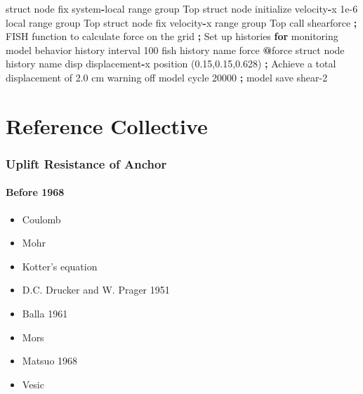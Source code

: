 \documentclass[a4paper, nobind]{templates/ociamthesis}
\providecommand{\tightlist}{%
  \setlength{\itemsep}{0pt}\setlength{\parskip}{0pt}}
\newenvironment{Shaded}{\begin{snugshade}}{\end{snugshade}}
\newcommand{\BuiltInTok}[1]{#1}
\newcommand{\ControlFlowTok}[1]{\textcolor[rgb]{0.13,0.29,0.53}{\textbf{#1}}}
\newcommand{\DecValTok}[1]{\textcolor[rgb]{0.00,0.00,0.81}{#1}}
\newcommand{\FloatTok}[1]{\textcolor[rgb]{0.00,0.00,0.81}{#1}}
\newcommand{\NormalTok}[1]{#1}
\newcommand{\OperatorTok}[1]{\textcolor[rgb]{0.81,0.36,0.00}{\textbf{#1}}}
\newcommand{\StringTok}[1]{\textcolor[rgb]{0.31,0.60,0.02}{#1}}
\renewenvironment{Shaded}
{
  \vspace{10pt}%
  \begin{snugshade}%
}{%
  \end{snugshade}%
  \vspace{8pt}%
}
\begin{document}
\begin{Shaded}
\begin{Highlighting}[]
\NormalTok{    struct node fix system}\OperatorTok{{-}}\NormalTok{local }\BuiltInTok{range}\NormalTok{ group }\StringTok{\textquotesingle{}Top\textquotesingle{}}
\NormalTok{    struct node initialize velocity}\OperatorTok{{-}}\NormalTok{x }\FloatTok{1e{-}6}\NormalTok{ local }\BuiltInTok{range}\NormalTok{ group }\StringTok{\textquotesingle{}Top\textquotesingle{}}
\NormalTok{    struct node fix velocity}\OperatorTok{{-}}\NormalTok{x }\BuiltInTok{range}\NormalTok{ group }\StringTok{\textquotesingle{}Top\textquotesingle{}}
\NormalTok{    call }\StringTok{\textquotesingle{}shearforce\textquotesingle{}} \OperatorTok{;}\NormalTok{ FISH function to calculate force on the grid}
    \OperatorTok{;}\NormalTok{ Set up histories }\ControlFlowTok{for}\NormalTok{ monitoring model behavior}
\NormalTok{    history interval }\DecValTok{100}
\NormalTok{    fish history name }\StringTok{\textquotesingle{}force\textquotesingle{}} \OperatorTok{@}\NormalTok{force}
\NormalTok{    struct node history name }\StringTok{\textquotesingle{}disp\textquotesingle{}}\NormalTok{ displacement}\OperatorTok{{-}}\NormalTok{x position (}\FloatTok{0.15}\NormalTok{,}\FloatTok{0.15}\NormalTok{,}\FloatTok{0.628}\NormalTok{)}
    \OperatorTok{;}\NormalTok{ Achieve a total displacement of }\FloatTok{2.0}\NormalTok{ cm}
\NormalTok{    warning off}
\NormalTok{    model cycle }\DecValTok{20000}
    \OperatorTok{;}
\NormalTok{    model save }\StringTok{\textquotesingle{}shear{-}2\textquotesingle{}}
\end{Highlighting}
\end{Shaded}

\startappendices

\hypertarget{reference-collective}{%
\chapter{Reference Collective}\label{reference-collective}}

\hypertarget{uplift-resistance-of-anchor}{%
\subsection{Uplift Resistance of Anchor}\label{uplift-resistance-of-anchor}}

\hypertarget{before-1968}{%
\subsubsection{Before 1968}\label{before-1968}}

\begin{itemize}
\tightlist
\item
  Coulomb
\item
  Mohr
\item
  Kotter's equation
\item
  D.C. Drucker and W. Prager 1951
\item
  Balla 1961
\item
  Mors
\item
  Matsuo 1968
\item
  Vesic
\end{itemize}
\end{document}
